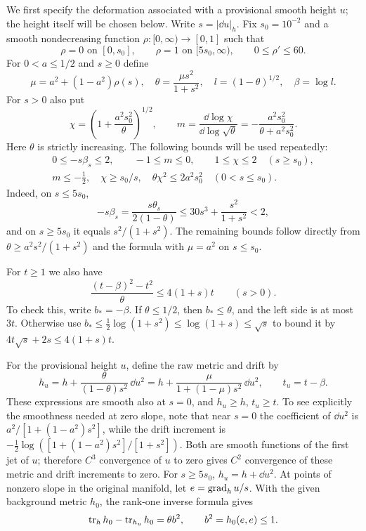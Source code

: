We first specify the deformation associated with a provisional smooth
height $u$; the height itself will be chosen below. Write $s=|\dd u|_h$.
Fix $s_0=10^{-2}$ and a smooth nondecreasing function $\rho:[0,\infty)
\to[0,1]$ such that
\[
 \rho=0\text{ on }[0,s_0],\qquad
 \rho=1\text{ on }[5s_0,\infty),\qquad 0\le\rho'\le60.
\]
For $0<a\le1/2$ and $s\ge0$ define
\begin{equation}\label{step:switch}
 \mu=a^2+(1-a^2)\rho(s),\quad
 \theta=\frac{\mu s^2}{1+s^2},\quad
 l=(1-\theta)^{1/2},\quad \beta=\log l.
\end{equation}
For $s>0$ also put
\begin{equation}\label{step:chi}
 \chi=\left(1+\frac{a^2s_0^2}{\theta}\right)^{1/2},\qquad
 m=\frac{\dd\log\chi}{\dd\log\sqrt\theta}
   =-\frac{a^2s_0^2}{\theta+a^2s_0^2}.
\end{equation}
Here $\theta$ is strictly increasing.  The following bounds will be used
repeatedly:
\begin{equation}\label{step:switch-bounds}
\begin{gathered}
 0\le -s\beta_s\le2,\qquad -1\le m\le0,\qquad
 1\le\chi\le2\quad(s\ge s_0),\\
 m\le-\tfrac12,\quad \chi\ge s_0/s,\quad
 \theta\chi^2\le2a^2s_0^2\quad(0<s\le s_0).
\end{gathered}
\end{equation}
Indeed, on $s\le5s_0$,
\[
 -s\beta_s=\frac{s\theta_s}{2(1-\theta)}
 \le30s^3+\frac{s^2}{1+s^2}<2,
\]
and on $s\ge5s_0$ it equals $s^2/(1+s^2)$.  The remaining bounds follow
directly from $\theta\ge a^2s^2/(1+s^2)$ and the formula with $\mu=a^2$
on $s\le s_0$.

For $t\ge1$ we also have
\begin{equation}\label{step:beta-budget}
 \frac{(t-\beta)^2-t^2}{\theta}\le4(1+s)t\qquad(s>0).
\end{equation}
To check this, write $b_*=-\beta$.  If $\theta\le1/2$, then
$b_*\le\theta$, and the left side is at most $3t$.  Otherwise use
$b_*\le\tfrac12\log(1+s^2)\le\log(1+s)\le\sqrt s$ to bound it by
$4t\sqrt s+2s\le4(1+s)t$.

For the provisional height $u$, define the raw metric and drift by
\begin{equation}\label{step:raw-output}
 h_u=h+\frac{\theta}{(1-\theta)s^2}\,\dd u^2
     =h+\frac{\mu}{1+(1-\mu)s^2}\,\dd u^2,
 \qquad t_u=t-\beta.
\end{equation}
These expressions are smooth also at $s=0$, and $h_u\ge h$, $t_u\ge t$.
To see explicitly the smoothness needed at zero slope, note that near $s=0$
the coefficient of $\dd u^2$ is
$a^2/[1+(1-a^2)s^2]$, while the drift increment is
$-\tfrac12\log([1+(1-a^2)s^2]/[1+s^2])$.
Both are smooth functions of the first jet of $u$; therefore
$C^3$ convergence of $u$ to zero gives $C^2$ convergence of these
metric and drift increments to zero.
For $s\ge5s_0$, $h_u=h+\dd u^2$.  At points of nonzero slope in the original manifold, let
$e=\operatorname{grad}_hu/s$. With the given background metric $h_0$, the rank-one
inverse formula gives
\begin{equation}\label{step:trace}
 \operatorname{tr}_hh_0-\operatorname{tr}_{h_u}h_0=\theta b^2,
 \qquad b^2=h_0(e,e)\le1.
\end{equation}

